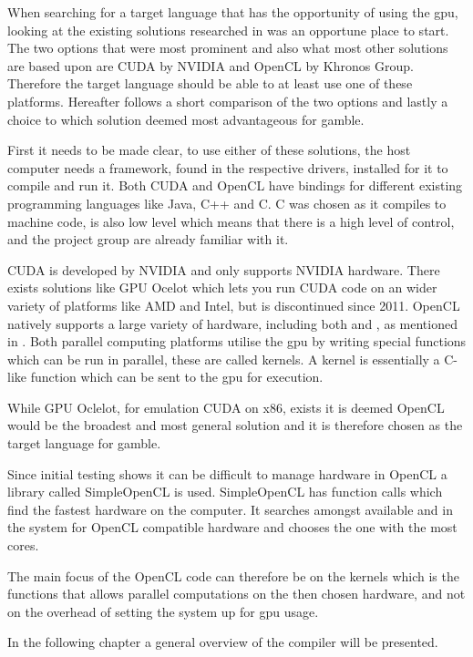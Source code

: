 When searching for a target language that has the opportunity of using the \acrshort{gpu}, looking at the existing solutions researched in  was an opportune place to start.
The two options that were most prominent and also what most other solutions are based upon are CUDA by NVIDIA and OpenCL by Khronos Group.
Therefore the target language should be able to at least use one of these platforms. 
Hereafter follows a short comparison of the two options and lastly a choice to which solution deemed most advantageous for \gls{gamble}.

First it needs to be made clear, to use either of these solutions, the host computer needs a framework, found in the respective drivers, installed for it to compile and run it. 
Both CUDA and OpenCL have bindings for different existing programming languages like Java, C++ and C.
C was chosen as it compiles to machine code, is also low level which means that there is a high level of control, and the project group are already familiar with it. 

CUDA is developed by NVIDIA and only supports NVIDIA hardware.
There exists solutions like GPU Ocelot which lets you run CUDA code on an wider variety of platforms like AMD and Intel, but is discontinued since 2011. \citep{Diamos:2010:ODO:1854273.1854318}
OpenCL natively supports a large variety of hardware, including both  and , as mentioned in .
Both parallel computing platforms utilise the \acrshort{gpu} by writing special functions which can be run in parallel, these are called kernels.
A kernel is essentially a C-like function which can be sent to the \acrshort{gpu} for execution.

While GPU Oclelot, for emulation CUDA on x86, exists it is deemed OpenCL would be the broadest and most general solution and it is therefore chosen as the target language for \gls{gamble}.

Since initial testing shows it can be difficult to manage hardware in OpenCL a library called SimpleOpenCL is used.
SimpleOpenCL has function calls which find the fastest hardware on the computer.
It searches amongst available  and  in the system for OpenCL compatible hardware and chooses the one with the most cores. \citep{simpleCL}

The main focus of the OpenCL code can therefore be on the kernels which is the functions that allows parallel computations on the then chosen hardware, and not on the overhead of setting the system up for \acrshort{gpu} usage.

In the following chapter a general overview of the compiler will be presented.
